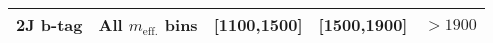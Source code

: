 \begin{tabular*}{\textwidth}{@{\extracolsep{\fill}}lrrrr}
\toprule
\textbf{2J} b-tag & All $m_{\mathrm{eff.}}$ bins & [1100,1500] & [1500,1900] & $>1900$ \\
\midrule

\midrule

\midrule

\toprule
\midrule



\midrule

\midrule


\bottomrule
\end{tabular*}
